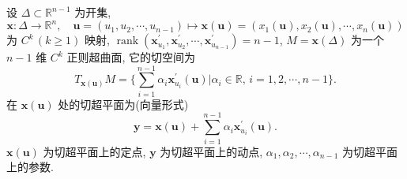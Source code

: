 \begin{example}\label{ex:9.1.3}
设 $\Delta \subset \mathbb{R}^{n-1}$ 为开集,
\[
  \boldsymbol{x}\colon \Delta \to \mathbb{R}^{n}, \quad \boldsymbol{u} = (u_{1}, u_{2}, \cdots, u_{n-1}) \mapsto \boldsymbol{x}(\boldsymbol{u}) = (x_{1}(\boldsymbol{u}), x_{2}(\boldsymbol{u}), \cdots, x_{n}(\boldsymbol{u}))
\]
为 $C^{k}\,(k \geqslant 1)$ 映射, $\operatorname{rank}(\boldsymbol{x}_{u_{1}}^{\prime}, \boldsymbol{x}_{u_{2}}^{\prime}, \cdots, \boldsymbol{x}_{u_{n-1}}^{\prime}) = n - 1$, $M = \boldsymbol{x}(\Delta)$ 为一个 $n - 1$ 维 $C^{k}$ 正则超曲面, 它的切空间为
\[
  T_{\boldsymbol{x}(\boldsymbol{u})}M = \Big\{\sum_{i=1}^{n-1}\alpha_{i}\boldsymbol{x}_{u_{i}}^{\prime}(\boldsymbol{u}) \mathrel{\Big|} \alpha_{i} \in \mathbb{R}, \, i = 1, 2, \cdots, n - 1\Big\}.
\]
在 $\boldsymbol{x}(\boldsymbol{u})$ 处的切超平面为(向量形式)
\[
  \boldsymbol{y} = \boldsymbol{x}(\boldsymbol{u}) + \sum_{i=1}^{n-1}\alpha_{i}\boldsymbol{x}_{u_{i}}^{\prime}(\boldsymbol{u}).
\]
$\boldsymbol{x}(\boldsymbol{u})$ 为切超平面上的定点, $\boldsymbol{y}$ 为切超平面上的动点, $\alpha_{1}, \alpha_{2}, \cdots, \alpha_{n-1}$ 为切超平面上的参数.


\end{example}
